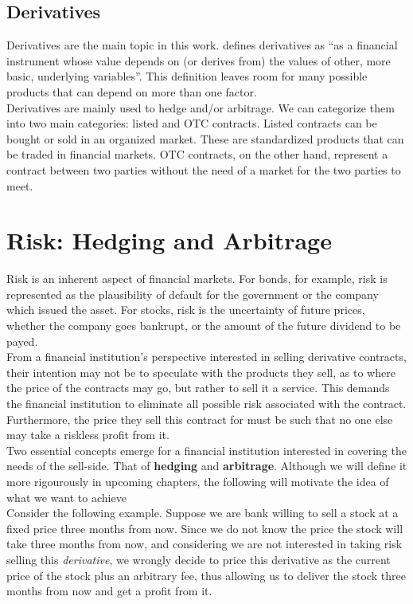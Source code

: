 \documentclass[../TGMAFFIRO]{subfiles}
\begin{document}
\subsection{Derivatives}
Derivatives are the main topic in this work.  defines derivatives as ``as a financial instrument whose value depends on (or derives from) the values of other, more basic, underlying variables''. This definition leaves room for many possible products that can depend on more than one factor.\\

Derivatives are mainly used to hedge and/or arbitrage. We can categorize them into two main categories: listed and OTC contracts. Listed contracts can be bought or sold in an organized market. These are standardized products that can be traded in financial markets. OTC contracts, on the other hand, represent a contract between two parties without the need of a market for the two parties to meet.

\section{Risk: Hedging and Arbitrage}
Risk is an inherent aspect of financial markets. For bonds, for example, risk is represented as the plausibility of default for the government or the company which issued the asset. For stocks, risk is the uncertainty of future prices, whether the company goes bankrupt, or the amount of the future dividend to be payed.\\

From a financial institution's perspective interested in selling derivative contracts, their intention may not be to speculate with the products they sell, as to where the price of the contracts may go, but rather to sell it a service. This demands the financial institution to eliminate all possible risk associated with the contract. Furthermore, the price they sell this contract for must be such that no one else may take a riskless profit from it.\\

Two essential concepts emerge for a financial institution interested in covering the needs of the sell-side. That of \textbf{hedging} and \textbf{arbitrage}. Although we will define it more rigourously in upcoming chapters, the following will motivate the idea of what we want to achieve\\

 Consider the following example. Suppose we are bank willing to sell a stock at a fixed price three months from now. Since we do not know the price the stock will take three months from now, and considering we are not interested in taking risk selling this \textit{derivative}, we wrongly decide to price this derivative as the current price of the stock plus an arbitrary fee, thus allowing us to deliver the stock three months from now and get a profit from it.\\
 
\end{document}
